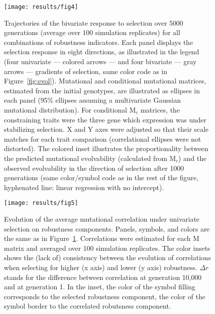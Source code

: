\documentclass[10pt,a4paper]{article}
\newcommand{\M}{\bm{\mathrm M}}
\begin{document}
\begin{figure}[thp!]
\begin{adjustwidth}{-1in}{0in}
\begin{flushright}
\texttt{[image: results/fig4]}
\caption{\color{Gray} \label{fig:evolvability} Trajectories of the bivariate response to selection over 5000 generations (average over 100 simulation replicates) for all combinations of robustness indicators. Each panel displays the selection response in eight directions, as illustrated in the legend (four univariate --- colored arrows --- and four bivariate --- gray arrows --- gradients of selection, same color code as in Figure~\ref{fig:evol}). Mutational and conditional mutational matrices, estimated from the initial genotypes, are illustrated as ellipses in each panel (95\% ellipses assuming a multivariate Gaussian mutational distribution). For conditional $\bm{\mathrm M}_c$ matrices, the constraining traits were the three gene which expression was under stabilizing selection. X and Y axes were adjusted so that their scale matches for each trait comparison (correlational ellipses were not distorted). The colored inset illustrates the proportionality between the predicted mutational evolvability (calculated from $\bm{\mathrm M}_c$) and the observed evolvability in the direction of selection after 1000 generations (same color/symbol code as in the rest of the figure, hyphenated line: linear regression with no intercept). }
\end{flushright}\end{adjustwidth}
\end{figure}

\begin{figure}[thp!]
\begin{flushright}
\texttt{[image: results/fig5]}
\caption{\color{Gray} \label{fig:evolcor} Evolution of the average mutational correlation under univariate selection on robustness components. Panels, symbols, and colors are the same as in Figure~\ref{fig:evolvability}. Correlations were estimated for each $\M$ matrix and averaged over 100 simulation replicates. The color insets shows the (lack of) consistency between the evolution of correlations when selecting for higher (x axis) and lower (y axis) robustness. $\Delta r$ stands for the difference between correlation at generation 10,000 and at generation 1. In the inset, the color of the symbol filling corresponds to the selected robustness component, the color of the symbol border to the correlated robutsness component.}
\end{flushright}%
\end{figure}
\end{document}
